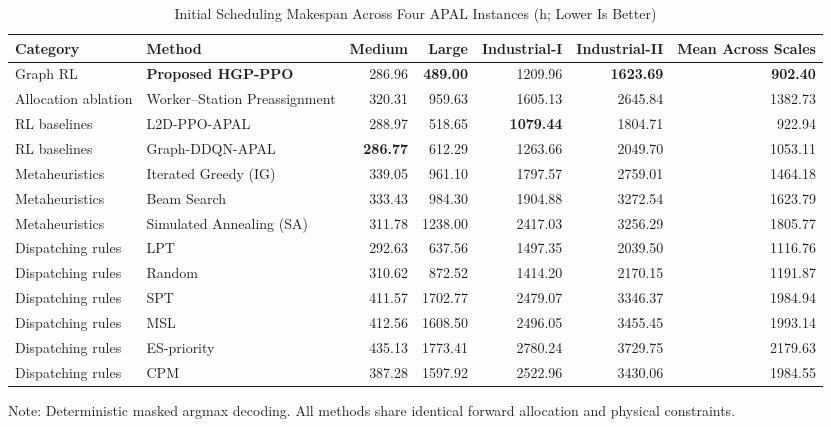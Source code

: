 \documentclass[journal,10pt]{IEEEtran}
\renewcommand{\arraystretch}{1.04}
\begin{document}
\begin{table}[!t]
\centering
\caption{Initial Scheduling Makespan Across Four APAL Instances (h; Lower Is Better)}
\label{tab:initial_results}
\setlength{\tabcolsep}{6pt}
\renewcommand{\arraystretch}{0.98}
\begin{adjustbox}{max width=\textwidth}
\begin{tabular}{@{}llrrrrr@{}}
\toprule
\textbf{Category} & \textbf{Method} & \textbf{Medium} & \textbf{Large} & \textbf{Industrial-I} & \textbf{Industrial-II} & \textbf{Mean Across Scales} \\
\midrule
Graph RL & \textbf{Proposed HGP-PPO} & 286.96 & \textbf{489.00} & 1209.96 & \textbf{1623.69} & \textbf{902.40} \\
Allocation ablation & Worker--Station Preassignment & 320.31 & 959.63 & 1605.13 & 2645.84 & 1382.73 \\
RL baselines & L2D-PPO-APAL & 288.97 & 518.65 & \textbf{1079.44} & 1804.71 & 922.94 \\
RL baselines & Graph-DDQN-APAL & \textbf{286.77} & 612.29 & 1263.66 & 2049.70 & 1053.11 \\
Metaheuristics & Iterated Greedy (IG) & 339.05 & 961.10 & 1797.57 & 2759.01 & 1464.18 \\
Metaheuristics & Beam Search & 333.43 & 984.30 & 1904.88 & 3272.54 & 1623.79 \\
Metaheuristics & Simulated Annealing (SA) & 311.78 & 1238.00 & 2417.03 & 3256.29 & 1805.77 \\
Dispatching rules & LPT & 292.63 & 637.56 & 1497.35 & 2039.50 & 1116.76 \\
Dispatching rules & Random & 310.62 & 872.52 & 1414.20 & 2170.15 & 1191.87 \\
Dispatching rules & SPT & 411.57 & 1702.77 & 2479.07 & 3346.37 & 1984.94 \\
Dispatching rules & MSL & 412.56 & 1608.50 & 2496.05 & 3455.45 & 1993.14 \\
Dispatching rules & ES-priority & 435.13 & 1773.41 & 2780.24 & 3729.75 & 2179.63 \\
Dispatching rules & CPM & 387.28 & 1597.92 & 2522.96 & 3430.06 & 1984.55 \\
\bottomrule
\end{tabular}
\end{adjustbox}
\par\smallskip
{\footnotesize Note: Deterministic masked argmax decoding. All methods share identical forward allocation and physical constraints.}
\end{table}
\end{document}
